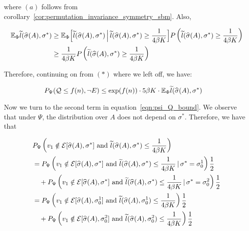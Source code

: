 \documentclass{article}
\begin{document}
where $(a)$ follows from corollary~\ref{cor:permutation_invariance_symmetry_sbm}. Also,

\begin{align*}
{\mathbb E}_{\Phi} \widetilde{l}(\widehat{\sigma}(A), \sigma^*) &\geq  
         {\mathbb E}_{\Phi}\Big[ \widetilde{l}(\widehat{\sigma}(A), \sigma^*) \,\Big|\, 
        \widetilde{l}(\widehat{\sigma}(A), \sigma^*) \geq \frac{1}{4\beta K}\Big] 
              P\left( \widetilde{l}(\widehat{\sigma}(A), \sigma^*) \geq \frac{1}{4\beta K} \right) \\
    &\geq \frac{1}{4\beta K} P\left( \widetilde{l}(\widehat{\sigma}(A), \sigma^*) \geq \frac{1}{4\beta K} \right)
\end{align*}

Therefore, continuing on from $\mathbf{(*)}$ where we left off, we have:

\begin{align*}
P_{\Psi}( \mathcal{Q} \leq f(n), \neg E) &\leq 
     \exp( f(n)) \cdot 5 \beta K \cdot {\mathbb E}_{\Phi} \widetilde{l}(\widehat{\sigma}(A), \sigma^*)
\end{align*}


Now we turn to the second term in equation~\ref{eqn:psi_Q_bound}. We observe that under $\Psi$, the distribution over $A$ does not depend on $\sigma^*$. Therefore, we have that

\begin{align*}
&P_{\Psi}\left(   v_1 \notin \mathcal{E}[\widehat{\sigma}(A), \sigma^*]   
    \textrm{ and }  \widetilde{l}(\widehat{\sigma}(A), \sigma^*) \leq \frac{1}{4\beta K} \right) \\
&=   P_{\Psi}\left( v_1 \notin \mathcal{E}[\widehat{\sigma}(A), \sigma^*] 
     \textrm{ and }\widetilde{l}(\widehat{\sigma}(A), \sigma^*) \leq \frac{1}{4\beta K} 
        {\,|\,} \sigma^* = \sigma_0^1 \right) \frac{1}{2}  \\
 &\quad +    P_{\Psi}\left( v_1 \notin \mathcal{E}[\widehat{\sigma}(A), \sigma^*]
       \textrm{ and }\widetilde{l}(\widehat{\sigma}(A), \sigma^*) \leq \frac{1}{4\beta K} 
       {\,|\,} \sigma^* = \sigma_0^2 \right) \frac{1}{2} \\
      &=  P_{\Psi}\left( v_1 \notin \mathcal{E}[\widehat{\sigma}(A), \sigma_0^1] 
                 \textrm{ and }\widetilde{l}(\widehat{\sigma}(A), \sigma_0^1)  \leq \frac{1}{4\beta K} \right) \frac{1}{2} \\
  &\quad +  
          P_{\Psi}\left( v_1 \notin \mathcal{E}[\widehat{\sigma}(A), \sigma_0^2]  
          \textrm{ and }\widetilde{l}(\widehat{\sigma}(A), \sigma_0^2)  \leq \frac{1}{4\beta K}  \right) \frac{1}{2} 
\end{align*}
\end{document}
